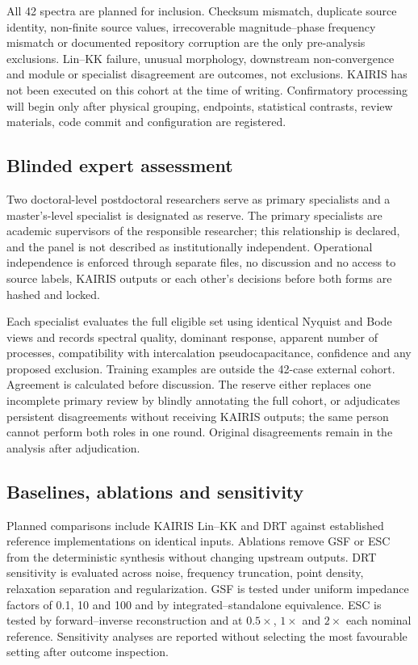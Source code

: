 \documentclass[a4paper,fleqn]{cas-sc}
\begin{document}
All 42 spectra are planned for inclusion. Checksum mismatch, duplicate source
identity, non-finite source values, irrecoverable magnitude--phase frequency
mismatch or documented repository corruption are the only pre-analysis
exclusions. Lin--KK failure, unusual morphology, downstream non-convergence and
module or specialist disagreement are outcomes, not exclusions. KAIRIS has not
been executed on this cohort at the time of writing. Confirmatory processing
will begin only after physical grouping, endpoints, statistical contrasts,
review materials, code commit and configuration are registered.

\subsection{Blinded expert assessment}\label{sec:experts}

Two doctoral-level postdoctoral researchers serve as primary specialists and a
master's-level specialist is designated as reserve. The primary specialists are
academic supervisors of the responsible researcher; this relationship is
declared, and the panel is not described as institutionally independent.
Operational independence is enforced through separate files, no discussion and
no access to source labels, KAIRIS outputs or each other's decisions before both
forms are hashed and locked.

Each specialist evaluates the full eligible set using identical Nyquist and Bode
views and records spectral quality, dominant response, apparent number of
processes, compatibility with intercalation pseudocapacitance, confidence and
any proposed exclusion. Training examples are outside the 42-case external
cohort. Agreement is calculated before discussion. The reserve either replaces
one incomplete primary review by blindly annotating the full cohort, or
adjudicates persistent disagreements without receiving KAIRIS outputs; the same
person cannot perform both roles in one round. Original disagreements remain in
the analysis after adjudication.

\subsection{Baselines, ablations and sensitivity}\label{sec:baselines}

Planned comparisons include KAIRIS Lin--KK and DRT against established reference
implementations on identical inputs. Ablations remove GSF or ESC from the
deterministic synthesis without changing upstream outputs. DRT sensitivity is
evaluated across noise, frequency truncation, point density, relaxation
separation and regularization. GSF is tested under uniform impedance factors of
0.1, 10 and 100 and by integrated--standalone equivalence. ESC is tested by
forward--inverse reconstruction and at $0.5\times$, $1\times$ and $2\times$ each
nominal reference. Sensitivity analyses are reported without selecting the most
favourable setting after outcome inspection.
\end{document}
